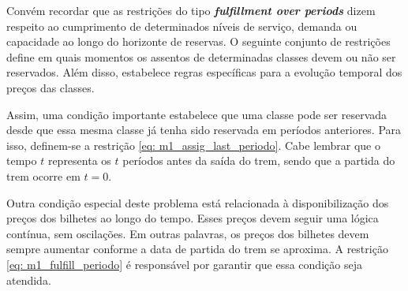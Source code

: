 

Convém recordar que as restrições do tipo \textbf{\textit{fulfillment over periods}} dizem respeito ao cumprimento de determinados níveis de serviço, demanda ou capacidade ao longo do horizonte de reservas. O seguinte conjunto de restrições define em quais momentos os assentos de determinadas classes devem ou não ser reservados. Além disso, estabelece regras específicas para a evolução temporal dos preços das classes.

Assim, uma condição importante estabelece que uma classe pode ser reservada desde que essa mesma classe já tenha sido reservada em períodos anteriores. Para isso, definem-se a restrição \eqref{eq: m1_assig_last_periodo}. Cabe lembrar que o tempo $t$ representa os $t$ períodos antes da saída do trem, sendo que a partida do trem ocorre em $t = 0$.

Outra condição especial deste problema está relacionada à disponibilização dos preços dos bilhetes ao longo do tempo. Esses preços devem seguir uma lógica contínua, sem oscilações. Em outras palavras, os preços dos bilhetes devem sempre aumentar conforme a data de partida do trem se aproxima. A restrição \eqref{eq: m1_fulfill_periodo} é responsável por garantir que essa condição seja atendida.



